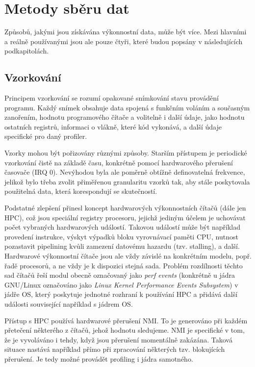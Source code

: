 \documentclass[czech,BP]{thesiskiv}
\begin{document}
\section{Metody sběru dat}

Způsobů, jakými jsou získávána výkonnostní data, může být více. Mezi hlavními a reálně používanými jsou ale pouze čtyři, které budou popsány v následujících podkapitolách.

\subsection{Vzorkování}\label{subsec:sampling}

Principem vzorkování se rozumí opakované snímkování stavu provádění programu. Každý snímek obsahuje data spojená s funkčním voláním a současným zanořením, hodnotu programového čítače a volitelně i další údaje, jako hodnotu ostatních registrů, informaci o vlákně, které kód vykonává, a další údaje specifické pro daný profiler.

Vzorky mohou být pořizovány různými způsoby. Starším přístupem je periodické vzorkování čistě na základě času, konkrétně pomocí hardwarového přerušení časovače (IRQ 0). Nevýhodou byla ale poměrně obtížně definovatelná frekvence, jelikož bylo třeba zvolit přiměřenou granularitu vzorků tak, aby stále poskytovala použitelná data, která korespondují se skutečností.

Podstatné zlepšení přinesl koncept hardwarových výkonnostních čítačů (dále jen HPC), což jsou speciální registry procesoru, jejichž jediným účelem je uchovávat počet vybraných hardwarových událostí. Takovou událostí může být například provedení instrukce, výskyt výpadků bloku vyrovnávací paměti CPU, nutnost pozastavit pipelining kvůli zamezení datovému hazardu (tzv. stalling), a další. Hardwarové výkonnostní čítače jsou ale vždy závislé na konkrétním modelu, popř. řadě procesorů, a ne vždy je k dispozici stejná sada. Problém rozdílnosti těchto sad čítačů řeší modul obecně označovaný jako \emph{perf events} (konkrétně u jádra GNU/Linux označováno jako \emph{Linux Kernel Performance Events Subsystem}) v jádře OS, který poskytuje jednotné rozhraní k používání HPC a přidává další události související například s jádrem OS\cite{perf1}.

Přístup s HPC používá hardwarové přerušení NMI. To je generováno při každém přetečení některého z čítačů, jehož hodnotu sledujeme\cite{perf1}. NMI je specifické v tom, že je vyvoláváno i tehdy, když jsou přerušení momentálně zakázána. Taková situace nastává například přímo při zpracování některých tzv. blokujících přerušení. Je tedy možné provádět profiling i jádra samotného.
\end{document}
